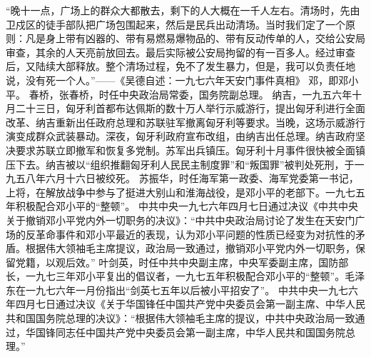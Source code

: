 \begin{maonote}
“晚十一点，广场上的群众大都散去，剩下的人大概在一千人左右。清场时，先由卫戍区的徒手部队把广场包围起来，然后是民兵出动清场。当时我们定了一个原则：凡是身上带有凶器的、带有易燃易爆物品的、带有反动传单的人，交给公安局审查，其余的人天亮前放回去。最后实际被公安局拘留的有一百多人。经过审查后，又陆续大部释放。整个清场过程，免不了发生暴力，但是，我可以负责任地说，没有死一个人。”——《吴德自述：一九七六年天安门事件真相》
邓，即邓小平。
春桥，张春桥，时任中央政治局常委，国务院副总理。
纳吉，一九五六年十月二十三日，匈牙利首都布达佩斯的数十万人举行示威游行，提出匈牙利进行全面改革、纳吉重新出任政府总理和苏联驻军撤离匈牙利等要求。当晚，这场示威游行演变成群众武装暴动。深夜，匈牙利政府宣布改组，由纳吉出任总理。纳吉政府坚决要求苏联立即撤军和恢复多党制。苏军出兵镇压。匈牙利十月事件很快被全面镇压下去。纳吉被以“组织推翻匈牙利人民民主制度罪”和“叛国罪”被判处死刑，于一九五八年六月十六日被绞死。
苏振华，时任海军第一政委、海军党委第一书记，上将，在解放战争中参与了挺进大别山和淮海战役，是邓小平的老部下。一九七五年积极配合邓小平的“整顿”。
中共中央一九七六年四月七日通过决议《中共中央关于撤销邓小平党内外一切职务的决议》：“中共中央政治局讨论了发生在天安门广场的反革命事件和邓小平最近的表现，认为邓小平问题的性质已经变为对抗性的矛盾。根据伟大领袖毛主席提议，政治局一致通过，撤销邓小平党内外一切职务，保留党籍，以观后效。”
叶剑英，时任中共中央副主席，中央军委副主席，国防部长，一九七三年邓小平复出的倡议者，一九七五年积极配合邓小平的“整顿”。毛泽东在一九七六年一月份指出“剑英七五年以后被小平招安了”。
中共中央一九七六年四月七日通过决议《关于华国锋任中国共产党中央委员会第一副主席、中华人民共和国国务院总理的决议》：“根据伟大领袖毛主席的提议，中共中央政治局一致通过，华国锋同志任中国共产党中央委员会第一副主席，中华人民共和国国务院总理。”
\end{maonote}
